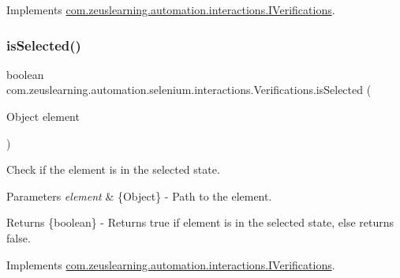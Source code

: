 Implements \hyperlink{interfacecom_1_1zeuslearning_1_1automation_1_1interactions_1_1IVerifications_a7d5af24aac4cb26bca024a0b19c56dad}{com.\+zeuslearning.\+automation.\+interactions.\+I\+Verifications}.

\hypertarget{classcom_1_1zeuslearning_1_1automation_1_1selenium_1_1interactions_1_1Verifications_a1b059d92d48f2d58bafddcef7deb3a54}{}\label{classcom_1_1zeuslearning_1_1automation_1_1selenium_1_1interactions_1_1Verifications_a1b059d92d48f2d58bafddcef7deb3a54} 
\subsubsection{\texorpdfstring{is\+Selected()}{isSelected()}}
{\footnotesize\ttfamily boolean com.\+zeuslearning.\+automation.\+selenium.\+interactions.\+Verifications.\+is\+Selected (\begin{DoxyParamCaption}\item[{Object}]{element }\end{DoxyParamCaption})\hspace{0.3cm}{\ttfamily [inline]}}

Check if the element is in the selected state.


\begin{DoxyParams}{Parameters}
{\em element} & \{Object\} -\/ Path to the element. \\
\hline
\end{DoxyParams}
\begin{DoxyReturn}{Returns}
\{boolean\} -\/ Returns {\ttfamily true} if element is in the selected state, else returns {\ttfamily false}. 
\end{DoxyReturn}


Implements \hyperlink{interfacecom_1_1zeuslearning_1_1automation_1_1interactions_1_1IVerifications_a5525ec4429db243e34b16151f78fa2d9}{com.\+zeuslearning.\+automation.\+interactions.\+I\+Verifications}.

\hypertarget{classcom_1_1zeuslearning_1_1automation_1_1selenium_1_1interactions_1_1Verifications_aebf1b991764984120a1f05adb69fdc4d}{}\label{classcom_1_1zeuslearning_1_1automation_1_1selenium_1_1interactions_1_1Verifications_aebf1b991764984120a1f05adb69fdc4d} 
